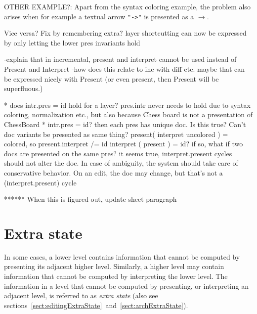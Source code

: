 \bc

OTHER EXAMPLE?: Apart from the syntax coloring example, the problem also arises when for example a textual arrow 
\verb|"->"| is presented as a $\rightarrow$. 

Vice versa? Fix by remembering extra?
 layer shortcutting can now be expressed by only letting the lower pres invariants hold

 -explain that in incremental, present and interpret cannot be used instead of Present and Interpret
 -how does this relate to inc with diff etc. maybe that can be expressed nicely with Present
 (or even present, then Present will be superfluous.)

* does   intr.pres = id hold for a layer? pres.intr never needs to hold due to syntax coloring, normalization etc., but also because Chess board is not a presentation of ChessBoard   
* intr.pres = id? then each pres has unique doc. Is this true? Can't doc variants be presented as same thing?
   present( interpret uncolored ) = colored, so present.interpret /= id
   interpret ( present ) = id? if so, what if two docs are presented on the same pres?
 it seems true, interpret.present cycles should not alter the doc. In case of ambiguity, the system should
 take care of conservative behavior. On an edit, the doc may change, but that's not a (interpret.present) cycle

****** When this is figured out, update sheet paragraph
\ec




%																
%																
%																
\section{Extra state} \label{sect:extraState}



In some cases, a lower level contains information that cannot be computed by presenting its adjacent higher level. Similarly, a higher level may contain information that cannot be computed by interpreting the lower level. The information in a level that cannot be computed by presenting, or interpreting an adjacent level, is referred to as {\em extra state} (also see sections~\ref{sect:editingExtraState}~and~\ref{sect:archExtraState}). 

